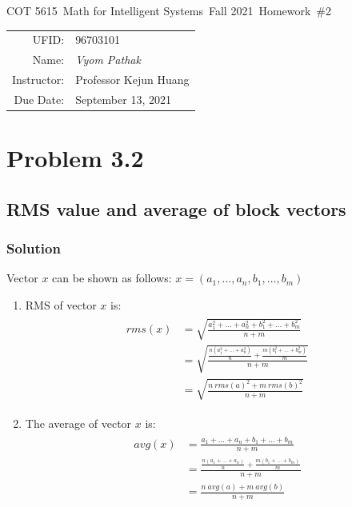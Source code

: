 \documentclass{article}
\newcommand{\hmwkTitle}{Homework\ \#2}
\newcommand{\hmwkDueDate}{September 13, 2021}
\newcommand{\hmwkClassCode}{COT 5615}
\newcommand{\hmwkClass}{Math for Intelligent Systems}
\newcommand{\hmwkClassYear}{Fall 2021}
\newcommand{\hmwkClassInstructor}{Professor Kejun Huang}
\newcommand{\hmwkAuthorName}{\textit{Vyom Pathak}}
\newcommand{\hmwkUFID}{96703101}
\begin{document}
\begin{center}
{\Large \hmwkClassCode\ \hmwkClass\ \hmwkClassYear\ \hmwkTitle}

\begin{tabular}{rl}
UFID: & \hmwkUFID \\
Name: & \hmwkAuthorName \\
Instructor: & \hmwkClassInstructor \\
Due Date: & \hmwkDueDate \\ 
\end{tabular}
\end{center}

\section*{Problem 3.2}
\subsection*{RMS value and average of block vectors}
\subsubsection*{Solution}
Vector $x$ can be shown as follows: $x = (a_1,\ldots,a_n,b_1,\ldots,b_m)$
\begin{enumerate}[label=(\alph*)]
\item RMS of vector $x$ is:
\begin{align*}
\begin{split}
            rms(x) & = \sqrt{\frac{a_1^2+\ldots+a_n^2+b_1^2+\ldots+b_m^2}{n+m}}\\
            & = \sqrt{\frac{\frac{n(a_1^2+\ldots+a_n^2)}{n}+\frac{m(b_1^2+\ldots+b_m^2)}{m}}{n+m}}\\
            & = \sqrt{\frac{n\ rms(a)^2+m\ rms(b)^2}{n+m}}
\end{split}
\end{align*}
\item The average of vector $x$ is:
\begin{align*}
\begin{split}
    avg(x) & = \frac{a_1+\ldots+a_n+b_1+\ldots+b_m}{n+m}\\ 
    & = \frac{\frac{n(a_1+\ldots+a_n)}{n}+\frac{m(b_1+\ldots+b_m)}{m}}{n+m}\\
    & = \frac{n\ avg(a)+m\ avg(b)}{n+m}
\end{split}
\end{align*}
\end{enumerate}
\end{document}
